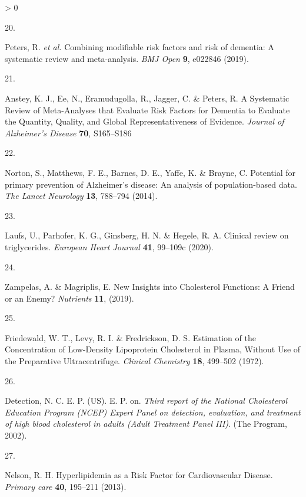 \documentclass[a4paper, twoside]{templates/ociamthesis}
\newlength{\cslhangindent}
\newlength{\csllabelwidth}
\newenvironment{CSLReferences}[3] %
 {%
  \setlength{\parindent}{0pt}
  \ifodd #1 \everypar{\setlength{\hangindent}{\cslhangindent}}\ignorespaces\fi
  \ifnum #2 > 0
  \setlength{\parskip}{#2\baselineskip}
  \fi
 }%
 {}
\newcommand{\CSLLeftMargin}[1]{\parbox[t]{\maxof{\widthof{#1}}{\csllabelwidth}}{#1}}
\newcommand{\CSLRightInline}[1]{\parbox[t]{\linewidth - \csllabelwidth}{#1}}
\begin{document}
\begin{CSLReferences}{0}{0}
\leavevmode\hypertarget{ref-peters2019}{}%
\CSLLeftMargin{20. }
\CSLRightInline{Peters, R. \emph{et al.} Combining modifiable risk factors and risk of dementia: A systematic review and meta-analysis. \emph{BMJ Open} \textbf{9}, e022846 (2019).}

\leavevmode\hypertarget{ref-ansteya}{}%
\CSLLeftMargin{21. }
\CSLRightInline{Anstey, K. J., Ee, N., Eramudugolla, R., Jagger, C. \& Peters, R. A {Systematic Review} of {Meta}-{Analyses} that {Evaluate Risk Factors} for {Dementia} to {Evaluate} the {Quantity}, {Quality}, and {Global Representativeness} of {Evidence}. \emph{Journal of Alzheimer's Disease} \textbf{70}, S165--S186}

\leavevmode\hypertarget{ref-norton2014potential}{}%
\CSLLeftMargin{22. }
\CSLRightInline{Norton, S., Matthews, F. E., Barnes, D. E., Yaffe, K. \& Brayne, C. Potential for primary prevention of {Alzheimer}'s disease: An analysis of population-based data. \emph{The Lancet Neurology} \textbf{13}, 788--794 (2014).}

\leavevmode\hypertarget{ref-laufs2020}{}%
\CSLLeftMargin{23. }
\CSLRightInline{Laufs, U., Parhofer, K. G., Ginsberg, H. N. \& Hegele, R. A. Clinical review on triglycerides. \emph{European Heart Journal} \textbf{41}, 99--109c (2020).}

\leavevmode\hypertarget{ref-zampelas2019}{}%
\CSLLeftMargin{24. }
\CSLRightInline{Zampelas, A. \& Magriplis, E. New {Insights} into {Cholesterol Functions}: {A Friend} or an {Enemy}? \emph{Nutrients} \textbf{11}, (2019).}

\leavevmode\hypertarget{ref-friedewald1972}{}%
\CSLLeftMargin{25. }
\CSLRightInline{Friedewald, W. T., Levy, R. I. \& Fredrickson, D. S. Estimation of the {Concentration} of {Low}-{Density Lipoprotein Cholesterol} in {Plasma}, {Without Use} of the {Preparative Ultracentrifuge}. \emph{Clinical Chemistry} \textbf{18}, 499--502 (1972).}

\leavevmode\hypertarget{ref-national2002third}{}%
\CSLLeftMargin{26. }
\CSLRightInline{Detection, N. C. E. P. (US). E. P. on. \emph{Third report of the {National Cholesterol Education Program} ({NCEP}) {Expert Panel} on detection, evaluation, and treatment of high blood cholesterol in adults ({Adult Treatment Panel III})}. ({The Program}, 2002).}

\leavevmode\hypertarget{ref-nelson2013}{}%
\CSLLeftMargin{27. }
\CSLRightInline{Nelson, R. H. Hyperlipidemia as a {Risk Factor} for {Cardiovascular Disease}. \emph{Primary care} \textbf{40}, 195--211 (2013).}


\end{CSLReferences}
\end{document}
